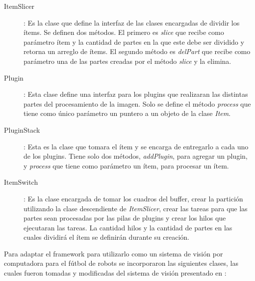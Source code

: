 \begin{description}
\item[ItemSlicer]: Es la clase que define la interfaz de las clases encargadas
	de dividir los ítems. Se definen dos métodos. El primero es \emph{slice}
	que recibe como parámetro ítem y la cantidad de partes en la que este
	debe ser dividido y retorna un arreglo de ítems. El segundo método es
	\emph{delPart} que recibe como parámetro una de las partes creadas por
	el método \emph{slice} y la elimina.

\item[Plugin]: Esta clase define una interfaz para los plugins que realizaran
	las distintas partes del procesamiento de la imagen. Solo se define el
	método \emph{process} que tiene como único parámetro un puntero a un
	objeto de la clase \emph{Item}.

\item[PluginStack]: Esta es la clase que tomara el ítem y se encarga de
	entregarlo a cada uno de los plugins. Tiene solo dos métodos,
	\emph{addPlugin}, para agregar un plugin, y \emph{process} que tiene
	como parámetro un ítem, para procesar un ítem.

\item[ItemSwitch]: Es la clase encargada de tomar los cuadros del buffer, crear
	la partición utilizando la clase descendiente de \emph{ItemSlicer},
	crear las tareas para que las partes sean procesadas por las pilas de
	plugins y crear los hilos que ejecutaran las tareas. La cantidad hilos y
	la cantidad de partes en las cuales dividirá el ítem se definirán
	durante su creación.

\end{description}

Para adaptar el framework para utilizarlo como un sistema de visión por
computadora para el fútbol de robots se incorporaron las siguientes clases, las
cuales fueron tomadas y modificadas del sistema de visión presentado en
\cite{torres2014}:


